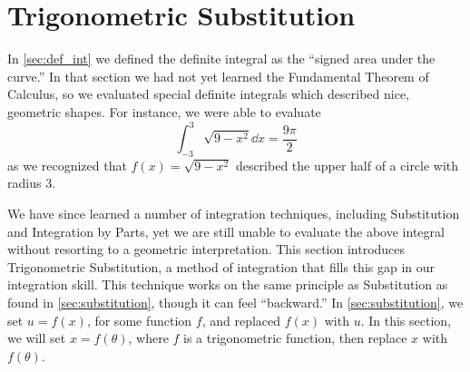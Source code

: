 

\section{Trigonometric Substitution}\label{sec:trig_sub}

In \autoref{sec:def_int} we defined the definite integral as the ``signed area under the curve.'' In that section we had not yet learned the Fundamental Theorem of Calculus, so we evaluated special definite integrals which described nice, geometric shapes. For instance, we were able to evaluate
\begin{equation}
\int_{-3}^3\sqrt{9-x^2}\dd x = \frac{9\pi}{2}\label{eq:trigsub1}%
\end{equation}
 as we recognized that $f(x) = \sqrt{9-x^2}$ described the upper half of a circle with radius 3. 

We have since learned a number of integration techniques, including Substitution and Integration by Parts, yet we are still unable to evaluate the above integral without resorting to a geometric interpretation. This section introduces Trigonometric Substitution, a method of integration that fills this gap in our integration skill. This technique works on the same principle as Substitution as found in \autoref{sec:substitution}, though it can feel ``backward.'' In \autoref{sec:substitution}, we set $u=f(x)$, for some function $f$, and replaced $f(x)$ with $u$. In this section, we will set $x=f(\theta)$, where $f$ is a trigonometric function, then replace $x$ with $f(\theta)$. 

